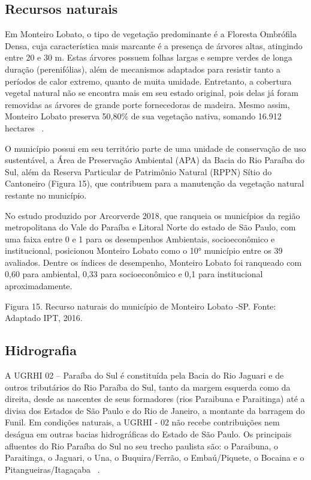 \subsection{Recursos naturais}

Em Monteiro Lobato, o tipo de vegetação predominante é a Floresta Ombrófila Densa, cuja característica mais marcante é a presença de árvores altas, atingindo entre 20 e 30 m.  Estas árvores possuem folhas largas e sempre verdes de longa duração (perenifólias), além de mecanismos adaptados para resistir tanto a períodos de calor extremo, quanto de muita umidade. Entretanto, a cobertura vegetal natural não se encontra mais em seu estado original, pois delas já foram removidas as árvores de grande porte fornecedoras de madeira. Mesmo assim, Monteiro Lobato preserva 50,80\% de sua vegetação nativa, somando 16.912 hectares ~\cite{MonteiroLobato2014}.

O município possui em seu território parte de uma unidade de conservação de uso sustentável, a Área de Preservação Ambiental (APA) da Bacia do Rio Paraíba do Sul, além da Reserva Particular de Patrimônio Natural (RPPN) Sítio do Cantoneiro (Figura 15), que contribuem para a manutenção da vegetação natural restante no município. 

No estudo produzido por Arcorverde 2018, que ranqueia os municípios da região metropolitana do Vale do Paraíba e Litoral Norte do estado de São Paulo, com uma faixa entre 0 e 1 para os desempenhos Ambientais, socioeconômico e institucional, posicionou Monteiro Lobato como o 10° município entre os 39 avaliados.   Dentre os índices de desempenho, Monteiro Lobato foi ranqueado com 0,60 para ambiental, 0,33 para socioeconômico e 0,1 para institucional ~\cite{arcoverdeproposiccao} aproximadamente. 

 Figura 15. Recurso naturais do município de Monteiro Lobato -SP.
Fonte: Adaptado IPT, 2016.

\subsection{Hidrografia}

A UGRHI  02 – Paraíba do Sul é constituída pela Bacia do Rio Jaguari e de outros tributários do Rio Paraíba do Sul, tanto da margem esquerda como da direita, desde as nascentes de seus formadores (rios Paraibuna e Paraitinga) até a divisa dos Estados de São Paulo e do Rio de Janeiro, a montante da barragem do Funil. Em condições naturais, a UGRHI - 02 não recebe contribuições nem deságua em outras bacias hidrográficas do Estado de São Paulo. Os principais afluentes do Rio Paraíba do Sul no seu trecho paulista são: o Paraibuna, o Paraitinga, o Jaguari, o Una, o Buquira/Ferrão, o Embaú/Piquete, o Bocaina e o Pitangueiras/Itagaçaba ~\cite{MonteiroLobato2014}.

